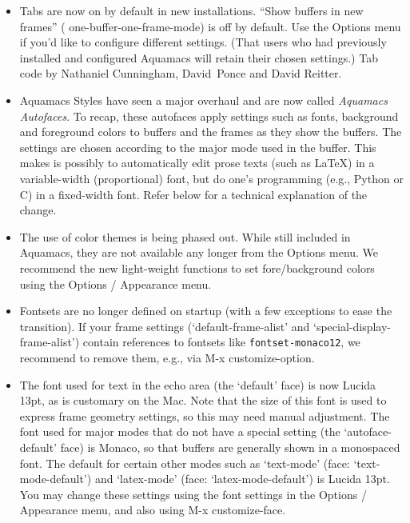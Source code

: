 \begin{itemize}

\item Tabs are now on by default in new installations. ``Show buffers in new frames'' ( one-buffer-one-frame-mode) is off by default.  Use the Options menu if you'd like to configure different settings.  (That users who had previously installed and configured Aquamacs will retain their chosen settings.)
Tab code by Nathaniel Cunningham, David~Ponce and David Reitter.

\item Aquamacs Styles have seen a major overhaul and are now called {\em Aquamacs Autofaces}.  To recap, these autofaces apply settings such as fonts, background and foreground colors to buffers and the frames as they show the buffers.  The settings are chosen according to the major mode used in the buffer.  This makes is possibly to automatically edit prose texts (such as LaTeX) in a variable-width (proportional) font, but do one's programming (e.g., Python or C) in a fixed-width font.
Refer below for a technical explanation of the change.

\item The use of color themes is being phased out.  While still included in Aquamacs, they are not available any longer from the Options menu.  We recommend the new light-weight functions to set fore/background colors using the Options / Appearance menu.

\item Fontsets are no longer defined on startup (with a few exceptions to ease the transition).  If your frame settings (`default-frame-alist' and `special-display-frame-alist') contain references to fontsets like {\tt fontset-monaco12}, we recommend to remove them, e.g., via M-x customize-option.

\item The font used for text in the echo area (the `default' face) is now Lucida 13pt, as is customary on the Mac.  Note that the size of this font is used to express frame geometry settings, so this may need manual adjustment.  The font used for major modes that do not have a special setting (the `autoface-default' face) is Monaco, so that buffers are generally shown in a monospaced font.  The default for certain other modes such as `text-mode' (face: `text-mode-default') and `latex-mode' (face: `latex-mode-default') is Lucida 13pt.  You may change these settings using the font settings in the Options / Appearance menu, and also using M-x customize-face.


\end{itemize}
